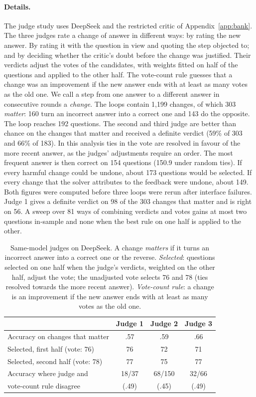 \documentclass[11pt]{article}
\newcommand{\ds}{DeepSeek}
\begin{document}
\paragraph{Details.}
The judge study uses \ds{} and the restricted critic of Appendix~\ref{app:bank}.
The three judges rate a change of answer in different ways: by rating the new answer. By rating it with the question in view and quoting the step objected to; and by deciding whether the critic's doubt before the change was justified.
Their verdicts adjust the votes of the candidates, with weights fitted on half of the questions and applied to the other half.
The vote-count rule guesses that a change was an improvement if the new answer ends with at least as many votes as the old one.
We call a step from one answer to a different answer in consecutive rounds a \emph{change}.
The loops contain 1{,}199 changes, of which 303 \emph{matter}: 160 turn an incorrect answer into a correct one and 143 do the opposite.
The loop reaches 192 questions.
The second and third judge are better than chance on the changes that matter and received a definite verdict (59\% of 303 and 66\% of 183).
In this analysis ties in the vote are resolved in favour of the more recent answer, as the judges' adjustments require an order. The most frequent answer is then correct on 154 questions (150.9 under random ties).
If every harmful change could be undone, about 173 questions would be selected. If every change that the solver attributes to the feedback were undone, about 149. Both figures were computed before three loops were rerun after interface failures.
Judge 1 gives a definite verdict on 98 of the 303 changes that matter and is right on 56.
A sweep over 81 ways of combining verdicts and votes gains at most two questions in-sample and none when the best rule on one half is applied to the other.

\begin{table}[h]
\centering
\small
\setlength{\tabcolsep}{3.5pt}
\begin{tabular}{@{}l ccc@{}}
\toprule
 & Judge 1 & Judge 2 & Judge 3 \\
\midrule
Accuracy on changes that matter & .57 & .59 & .66 \\
Selected, first half (vote: 76) & 76 & 72 & 71 \\
Selected, second half (vote: 78) & 77 & 75 & 77 \\
Accuracy where judge and & 18/37 & 68/150 & 32/66 \\
\quad vote-count rule disagree & (.49) & (.45) & (.49) \\
\bottomrule
\end{tabular}
\caption{Same-model judges on \ds. A change \emph{matters} if it turns an incorrect answer into a correct one or the reverse. \emph{Selected}: questions selected on one half when the judge's verdicts, weighted on the other half, adjust the vote; the unadjusted vote selects 76 and 78 (ties resolved towards the more recent answer). \emph{Vote-count rule}: a change is an improvement if the new answer ends with at least as many votes as the old one.}
\label{tab:judges}
\end{table}
\end{document}

